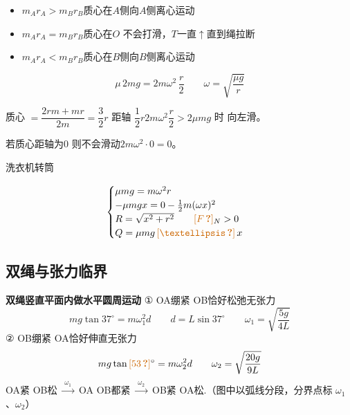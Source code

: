 \begin{itemize}
\item $m_Ar_A>m_Br_B$\quad 质心在$A$侧\quad 向$A$侧离心运动
\item $m_Ar_A=m_Br_B$\quad 质心在$O$ 不会打滑，$T$一直$\uparrow$直到绳拉断
\item $m_Ar_A<m_Br_B$\quad 质心在$B$侧\quad 向$B$侧离心运动
\end{itemize}
\[
\mu\,2mg=2m\omega^2\,\frac{r}{2}
\qquad
\omega=\sqrt{\frac{\mu g}{r}}
\]

\begin{problem}
\begin{solution}
质心 $=\dfrac{2rm+mr}{2m}=\dfrac32r$ 距轴 $\dfrac12r$\qquad $2m\omega^2\dfrac r2>2\mu mg$ 时 向左滑。

若质心距轴为0 则不会滑动\qquad $2m\omega^2\cdot0=0$。
\end{solution}
\end{problem}

\begin{problem}
洗衣机转筒
\begin{solution}
\[ \begin{cases}
\mu mg=m\omega^2r\\
-\mu mgx=0-\frac12m(\omega x)^2 \\ %
R=\sqrt{x^2+r^2}\qquad \unclear{F}_N>0 \\ %
Q=\mu mg\,\unclear{…}\,x %
\end{cases} \]
\end{solution}
\end{problem}

\subsection{双绳与张力临界}
\textbf{双绳竖直平面内做水平圆周运动}
① OA绷紧 OB恰好松弛无张力
\[ mg\tan37^\circ=m\omega_1^2d\qquad d=L\sin37^\circ\qquad \omega_1=\sqrt{\dfrac{5g}{4L}} \]
② OB绷紧 OA恰好伸直无张力
\[ mg\tan\unclear{53}^\circ=m\omega_2^2d\qquad \omega_2=\sqrt{\dfrac{20g}{9L}} \]
OA紧 OB松 $\xrightarrow{\ \omega_1\ }$ OA OB都紧 $\xrightarrow{\ \omega_2\ }$ OB紧 OA松.（图中以弧线分段，分界点标 $\omega_1$、$\omega_2$）

